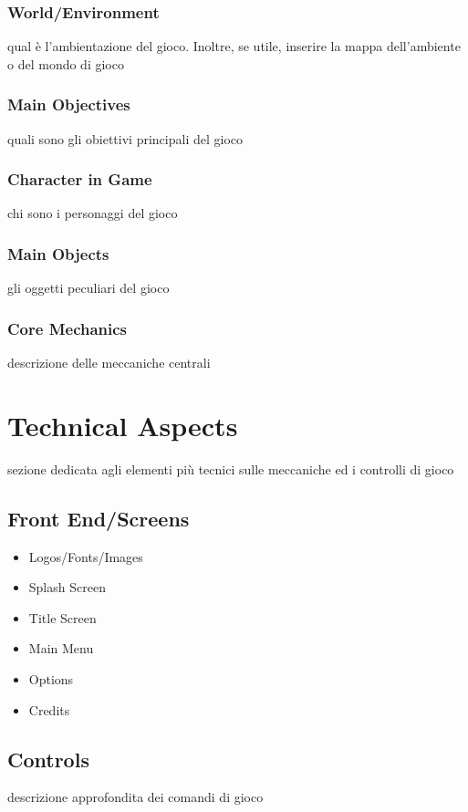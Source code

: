 \documentclass[a4paper]{scrreprt}
\begin{document}
\subsection{World/Environment}
qual è l'ambientazione del gioco. Inoltre, se utile, inserire la mappa dell'ambiente o del mondo di gioco

\subsection{Main Objectives}
quali sono gli obiettivi principali del gioco

\subsection{Character in Game}
chi sono i personaggi del gioco

\subsection{Main Objects}
gli oggetti peculiari del gioco

\subsection{Core Mechanics}
descrizione delle meccaniche centrali


\chapter{Technical Aspects}
sezione dedicata agli elementi più tecnici sulle meccaniche ed i controlli di gioco

\section{Front End/Screens}

\begin{itemize}
\item Logos/Fonts/Images
\item Splash Screen
\item Title Screen
\item Main Menu
\item Options
\item Credits
\end{itemize}

\section{Controls}
descrizione approfondita dei comandi di gioco
\end{document}
